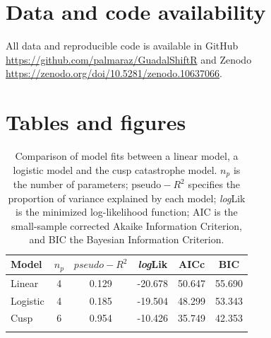 \documentclass[12pt]{article}
\begin{document}
\section*{Data and code availability}
\label{sec:Data and code availability}

All data and reproducible code is available in GitHub \url{https://github.com/palmaraz/GuadalShiftR} and Zenodo \url{https://zenodo.org/doi/10.5281/zenodo.10637066}.\\

\printbibliography

%
\newpage

\section*{Tables and figures}

\listoftables
\listoffigures

\newpage

	\begin{table}
		\centering
		\caption[Comparison of model fits between a linear model, a logistic model and the cusp catastrophe model]{Comparison of model fits between a linear model, a logistic model and the cusp catastrophe model. $ n_{p} $ is the number of parameters; $ \text{pseudo}-R^2 $ specifies the proportion of variance explained by each model; \textit{log}Lik is the minimized log-likelihood function; AIC is the small-sample corrected Akaike Information Criterion, and BIC the Bayesian Information Criterion.}
		\label{tab:TableCuspComp}
		\begin{tabular}{lccccc}%
			\toprule
			\textbf{Model} & \textbf{$ n_{p} $} & \textbf{$ pseudo-R^2 $} & \textbf{\textit{log}Lik} & \textbf{AICc} & \textbf{BIC} \\
			\midrule
			Linear & 4 & 0.129 & -20.678 & 50.647 & 55.690 \\
			Logistic & 4 & 0.185 & -19.504 & 48.299 & 53.343 \\
			Cusp & 6 & 0.954 & -10.426 & 35.749 & 42.353  \\
			\bottomrule
			& & & & & \\
		\end{tabular}
	\end{table}
\end{document}
